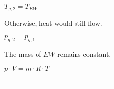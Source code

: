 \( T_{g,2} = T_{EW} \)  

Otherwise, heat would still flow.  

\( p_{g,2} = p_{g,1} \)  

The mass of \( EW \) remains constant.  

\( p \cdot V = m \cdot R \cdot T \)  

---